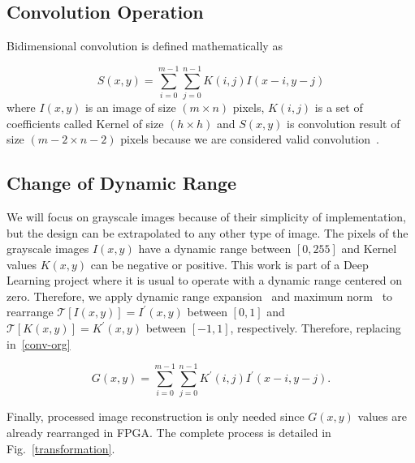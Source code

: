 \documentclass[conference,compsoc]{IEEEtran}
\begin{document}
\subsection{Convolution Operation}

Bidimensional convolution is defined mathematically as

\begin{equation}\label{conv-org}
  S(x,y) = \sum_{i=0}^{m-1} \sum_{j=0}^{n-1}K(i,j)I(x-i,y-j)
\end{equation}
where $I(x,y)$ is an image of size $(m \times n)$ pixels, $K(i,j)$ is a set of
coefficients called Kernel of size $(h \times h)$ and $S(x,y)$ is convolution
result of size $(m-2 \times n-2)$ pixels because we are considered valid
convolution~\cite{validconv}. 

\subsection{Change of Dynamic Range}

We will focus on grayscale images because of their simplicity of implementation,
but the design can be extrapolated to any other type of image. The pixels of the
grayscale images $I(x,y)$ have a dynamic range between $[0,255]$ and Kernel
values $K(x,y)$ can be negative or positive. This work is part of a Deep
Learning project where it is usual to operate with a dynamic range centered on
zero. Therefore, we apply dynamic range expansion~\cite{dinamic_rango} and
maximum norm~\cite{max_norm} to rearrange $\mathcal{T}[I(x,y)]=I^\prime(x,y)$
between $[0,1]$ and $\mathcal{T}[K(x,y)]=K^\prime(x,y)$ between $[-1,1]$,
respectively. Therefore, replacing in~\eqref{conv-org}

\begin{equation}\label{conv-org1}
  G(x,y) = \sum_{i=0}^{m-1} \sum_{j=0}^{n-1}K^\prime(i,j)I^\prime(x-i,y-j).
\end{equation}

Finally, processed image reconstruction is only needed since $G(x,y)$ values are already
rearranged in FPGA.
The complete process is detailed in Fig.~\ref{transformation}.
\end{document}
